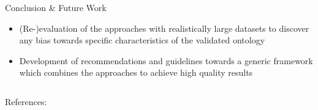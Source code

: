 \documentclass[final,hyperref={pdfpagelabels=true}]{beamer}
\begin{document}
\begin{frame}
\begin{columns}[t, onlytextwidth]
\begin{column}{\textwidth}
\begin{columns}[t, onlytextwidth]
\begin{column}{.49\textwidth}
\begin{block}{Conclusion \& Future Work}
\begin{minipage}[t][.25\textheight][c]{\textwidth}
\begin{minipage}[t]{0.93\textwidth}
							\begin{itemize}
								\small
								\justifying
								\setlength\itemsep{1cm}
								\item (Re-)evaluation of the approaches with realistically large datasets to discover any bias towards specific characteristics of the validated ontology
								\item Development of recommendations and guidelines towards a generic framework which combines the approaches to achieve high quality results
							\end{itemize}
						\end{minipage}
						\hfill
						\hbox{}
					\end{minipage}
				\end{block}
			\end{column}
		\end{columns}
		
		
		\begin{columns}[t, onlytextwidth]
			\begin{column}{\textwidth}
				\footnotesize
				
				References:
				
				\vspace{-1.3cm}
				\setlength{\columnsep}{-10cm}
				\begin{multicols}{2}
					
					
				\end{multicols}
			\end{column}
		\end{columns}
		
    \end{column}

  \end{columns}
\end{frame}
\end{document}
